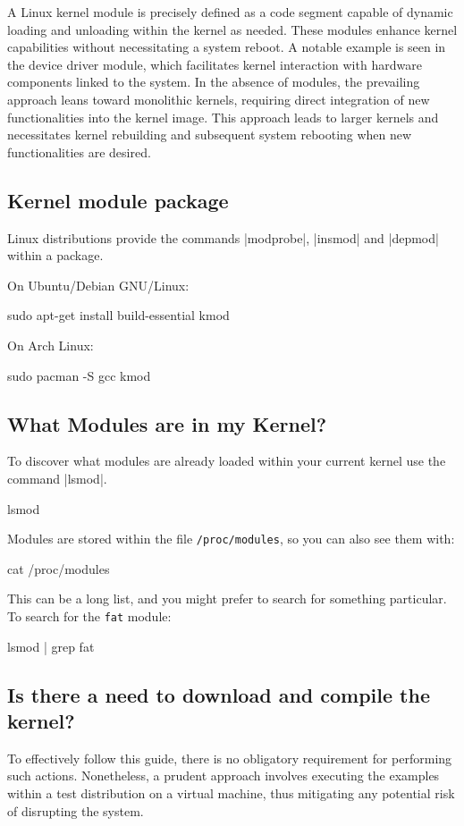 \documentclass[10pt, oneside]{book}
\begin{document}
A Linux kernel module is precisely defined as a code segment capable of dynamic loading and unloading within the kernel as needed.
These modules enhance kernel capabilities without necessitating a system reboot.
A notable example is seen in the device driver module, which facilitates kernel interaction with hardware components linked to the system.
In the absence of modules, the prevailing approach leans toward monolithic kernels,
requiring direct integration of new functionalities into the kernel image.
This approach leads to larger kernels and necessitates kernel rebuilding and subsequent system rebooting when new functionalities are desired.

\subsection{Kernel module package}
\label{sec:packages}

Linux distributions provide the commands \sh|modprobe|, \sh|insmod| and \sh|depmod| within a package.

On Ubuntu/Debian GNU/Linux:
\begin{codebash}
sudo apt-get install build-essential kmod
\end{codebash}

On Arch Linux:
\begin{codebash}
sudo pacman -S gcc kmod
\end{codebash}

\subsection{What Modules are in my Kernel?}
\label{sec:modutils}

To discover what modules are already loaded within your current kernel use the command \sh|lsmod|.
\begin{codebash}
lsmod
\end{codebash}

Modules are stored within the file \verb|/proc/modules|, so you can also see them with:
\begin{codebash}
cat /proc/modules
\end{codebash}

This can be a long list, and you might prefer to search for something particular.
To search for the \verb|fat| module:
\begin{codebash}
lsmod | grep fat
\end{codebash}

\subsection{Is there a need to download and compile the kernel?}
\label{sec:buildkernel}
To effectively follow this guide, there is no obligatory requirement for performing such actions.
Nonetheless, a prudent approach involves executing the examples within a test distribution on a virtual machine,
thus mitigating any potential risk of disrupting the system.
\end{document}
